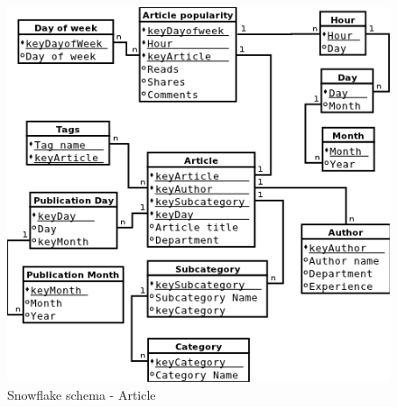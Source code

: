 \begin{figure}[!hbp]
    \includegraphics[scale=0.4]{schema_snowflake_article}
\caption{\label{pic:sn_art} Snowflake schema - Article}
\end{figure}

